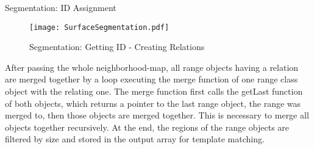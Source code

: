 \begin{algorithm}[H]

	\begin{algorithmic}
	
		\Else
		\EndIf
		
		\EndIf
		
		\EndIf
		
		\EndIf
\EndFor
	\end{algorithmic}
 \caption{Segmentation: ID Assignment}
 \label{alg:IDs}
\end{algorithm}


\begin{figure}[H]
\begin{center}
  \texttt{[image: SurfaceSegmentation.pdf]}
  \caption{Segmentation: Getting ID - Creating Relations}
  \label{figure:segment}
\end{center}
\end{figure}

After passing the whole neighborhood-map, all range objects having a relation are merged together
by a loop executing the merge function of one range class object with the relating one.
The merge function first calls the getLast function of both objects, which returns a pointer to the
last range object, the range was merged to, then those objects are merged together. 
This is necessary to merge all objects together recursively. At the end, the regions of the range objects are 
filtered by size and stored in the output array for template matching. 

